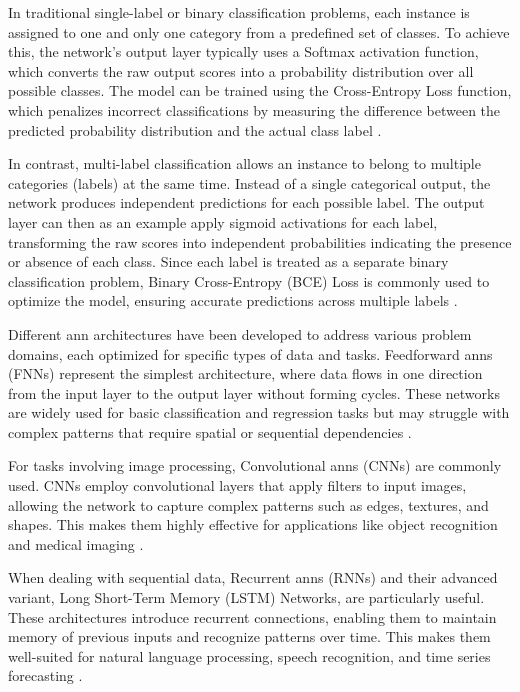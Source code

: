 In traditional single-label or binary classification problems, each instance is assigned to one and only one category from a predefined set of classes.
To achieve this, the network's output layer typically uses a Softmax activation function, which converts the raw output scores into a probability distribution over all possible classes.
The model can be trained using the Cross-Entropy Loss function, which penalizes incorrect classifications by measuring the difference between the predicted probability distribution and the actual class label \cite{russell2016artificial,herrera2016multilabel}.

In contrast, multi-label classification allows an instance to belong to multiple categories (labels) at the same time.
Instead of a single categorical output, the network produces independent predictions for each possible label.
The output layer can then as an example apply sigmoid activations for each label, transforming the raw scores into independent probabilities indicating the presence or absence of each class.
Since each label is treated as a separate binary classification problem, Binary Cross-Entropy (BCE) Loss is commonly used to optimize the model, ensuring accurate predictions across multiple labels \cite{russell2016artificial,herrera2016multilabel}.

Different \ac{ann} architectures have been developed to address various problem domains, each optimized for specific types of data and tasks.
Feedforward \ac{ann}s (FNNs) represent the simplest architecture, where data flows in one direction from the input layer to the output layer without forming cycles.
These networks are widely used for basic classification and regression tasks but may struggle with complex patterns that require spatial or sequential dependencies \cite{russell2016artificial,glorot2010understanding}.

For tasks involving image processing, Convolutional \ac{ann}s (CNNs) are commonly used.
CNNs employ convolutional layers that apply filters to input images, allowing the network to capture complex patterns such as edges, textures, and shapes.
This makes them highly effective for applications like object recognition and medical imaging \cite{o2015introduction, sharma2024deep}.

When dealing with sequential data, Recurrent \ac{ann}s (RNNs) and their advanced variant, Long Short-Term Memory (LSTM) Networks, are particularly useful.
These architectures introduce recurrent connections, enabling them to maintain memory of previous inputs and recognize patterns over time.
This makes them well-suited for natural language processing, speech recognition, and time series forecasting \cite{medsker2001recurrent}.

